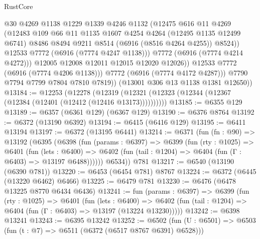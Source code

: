 \begin{lexlean}{RustCore}
\begin{coremodule}
                      @30
                      @4269
                      @1138
                      @1229
                      @1339
                      @4246
                      @1132
                      (@12475
                        @616
                        @11
                        @4269
                        (@12483
                          @109
                          @66
                          @11
                          @1135
                          @1607
                          @4254
                          @4264
                          (@12495 @1135 @12499 @6741)
                          @8486
                          @8494
                          @9211
                          @8514
                          (@6916 (@8516 @4264 @4255))
                          @8524))
                      @12533
                      @7772
                      (@6916 (@7774 @4247 @1138)))
                    @7772
                    (@6916 (@7774 @4214 @4272)))
                  @12005
                  @12008
                  @12011
                  @12015
                  @12020
                  @12026))
              @12533
              @7772
              (@6916 (@7774 @4206 @1138)))
            @7772
            (@6916 (@7774 @4172 @4287)))
          @7790
          @7794
          @7799
          @7804
          @7810
          @7819))
      (@13001 @306 @13 @1138 @1381 @12650))
@13184 := @12253
    (@12278 (@12319 (@12321 (@12323 (@12344 (@12367 (@12384 (@12401 (@12412 (@12416 @13173))))))))))
@13185 := @6355 @129
@13189 := @6357 (@6361 @129) (@6367 @129)
@13190 := @6376 @8764
@13192 := @6372 (@13190 @6392)
@13194 := @6415 (@6416 @129)
@13195 := @6411 @13194
@13197 := @6372 (@13195 @6441)
@13214 := @6371
    (fun (fn : @90) =>
    @13192
      (@6395
        (@6398
          (fun (params : @6397) =>
          @6399
            (fun (rty : @1025) =>
            @6401
              (fun (lets : @6400) =>
              @6402 (fun (tail : @1204) => @6404 (fun (Γ : @6403) => @13197 @6488))))))
        @6534))
    @781
@13217 := @6540 (@13190 (@6390 @781))
@13220 := @6453 (@6454 @781) @8767
@13224 := @6372 (@6445 (@13220 @6462) @6466)
@13225 := @6479 @781
@13230 := @6476 (@6478 @13225 @8770 @6434 @6436)
@13241 := fun (params : @6397) =>
  @6399
    (fun (rty : @1025) =>
    @6401
      (fun (lets : @6400) =>
      @6402 (fun (tail : @1204) => @6404 (fun (Γ : @6403) => @13197 (@13224 @13230)))))
@13242 := @6398 @13241
@13243 := @6395 @13242
@13252 := @6502 (fun (U : @6501) => @6503 (fun (t : @7) => @6511 (@6372 (@6517 @8767 @6391) @6528)))

\end{coremodule}
\end{lexlean}
